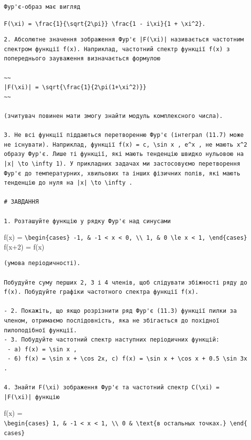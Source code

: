 \documentclass[
  ukrainian,
]{article}
\begin{document}
\begin{verbatim}
Фур'є-образ має вигляд
\end{verbatim}

\texttt{F(\textbackslash{}xi)\ =\ \textbackslash{}frac\{1\}\{\textbackslash{}sqrt\{2\textbackslash{}pi\}\}\ \textbackslash{}frac\{1\ -\ i\textbackslash{}xi\}\{1\ +\ \textbackslash{}xi\^{}2\}.}

\begin{verbatim}
2. Абсолютне значення зображення Фур'є |F(\xi)| називається частотним спектром функції f(x). Наприклад, частотний спектр функції f(x) з попереднього зауваження визначається формулою

~~
|F(\xi)| = \sqrt{\frac{1}{2\pi(1+\xi^2)}}
~~

(зчитувач повинен мати змогу знайти модуль комплексного числа).

3. Не всі функції піддаються перетворенню Фур'є (інтеграл (11.7) може не існувати). Наприклад, функції f(x) = c, \sin x , e^x , не мають x^2 образу Фур'є. Лише ті функції, які мають тенденцію швидко нульовою на |x| \to \infty 1). У прикладних задачах ми застосовуємо перетворення Фур'є до температурних, хвильових та інших фізичних полів, які мають тенденцію до нуля на |x| \to \infty .

# ЗАВДАННЯ

1. Розташуйте функцію у рядку Фур'є над синусами
\end{verbatim}

f(x) =
\texttt{\textbackslash{}begin\{cases\}\ -1,\ \&\ -1\ \textless{}\ x\ \textless{}\ 0,\ \textbackslash{}\textbackslash{}\ 1,\ \&\ 0\ \textbackslash{}le\ x\ \textless{}\ 1,\ \textbackslash{}end\{cases\}}
f(x+2) = f(x)

\begin{verbatim}
(умова періодичності).

Побудуйте суму перших 2, 3 і 4 членів, щоб слідувати збіжності ряду до f(x). Побудуйте графіки частотного спектра функції f(x).

- 2. Покажіть, що якщо розрізнити ряд Фур'є (11.3) функції пилки за членом, отримаємо послідовність, яка не збігається до похідної пилоподібної функції.
- 3. Побудуйте частотний спектр наступних періодичних функцій:
 - a) f(x) = \sin x ,
 - 6) f(x) = \sin x + \cos 2x, c) f(x) = \sin x + \cos x + 0.5 \sin 3x .

4. Знайти F(\xi) зображення Фур'є та частотний спектр C(\xi) = |F(\xi)| функцію
\end{verbatim}

f(x) =
\texttt{\textbackslash{}begin\{cases\}\ 1,\ \&\ -1\ \textless{}\ x\ \textless{}\ 1,\ \textbackslash{}\textbackslash{}\ 0\ \&\ \textbackslash{}text\{в\ остальных\ точках.\}\ \textbackslash{}end\{cases\}}
\end{document}
